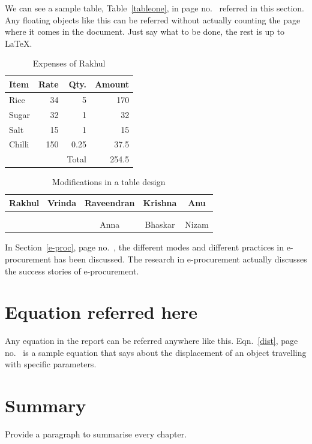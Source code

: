 We can see a sample table, Table~\ref{tableone}, in page no.~\pageref{tableone} referred in this section. Any floating objects like this can be referred without actually counting the page where it comes in the document. Just say what to be done, the rest is up to \LaTeX. %
\begin{table}[h!]\centering \caption{Expenses of Rakhul}\label{tab-exp}
\begin{tabular}{|l|r|r|r|}
\hline 
Item	&	Rate	&	Qty.	&	Amount	\\ \hline
Rice	&	34	&	5	&	170	\\ \hline
Sugar	&	32	&	1	&	32	\\ \hline
Salt	&	15	&	1	&	15	\\ \hline
Chilli	&	150	&	0.25	&	37.5	\\ \hline
	&		&	Total	&	254.5	\\ 
	\hline
\end{tabular}

\end{table}

\begin{table}[h!]\centering \caption{Modifications in a table design}
\begin{tabular}{||c||c||c||c||c||}
\hline Rakhul & Vrinda & Raveendran & Krishna & Anu \\ 
\hline  &  &  &  &  \\ 
\hline  &  &  &  &  \\ 
\hline  &  & Anna & Bhaskar & Nizam \\ 
\hline 
\end{tabular} 
\end{table}


In Section~\ref{e-proc}, page no.~\pageref{e-proc}, the different modes and different practices in e-procurement has been discussed. The research in e-procurement actually discusses the success stories of e-procurement.
\section{Equation referred here}

Any equation in the report can be referred anywhere like this. Eqn.~\eqref{dist}, page no.~\pageref{dist}  is a sample equation that says about the displacement of an object travelling with specific parameters. 

\section{Summary}

Provide a paragraph to summarise every chapter.